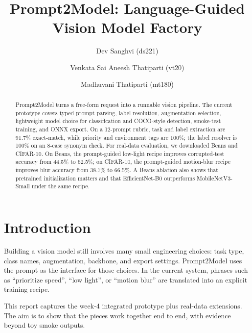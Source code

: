 \documentclass[10pt,twocolumn,letterpaper]{article}
\begin{document}
\title{Prompt2Model: Language-Guided Vision Model Factory}

\author{
Dev Sanghvi (ds221)
\and
Venkata Sai Aneesh Thatiparti (vt20)
\and
Madhuvani Thatiparti (mt180)
}

\maketitle

\begin{abstract}
Prompt2Model turns a free-form request into a runnable vision pipeline. The current prototype covers typed prompt parsing, label resolution, augmentation selection, lightweight model choice for classification and COCO-style detection, smoke-test training, and ONNX export. On a 12-prompt rubric, task and label extraction are 91.7\% exact-match, while priority and environment tags are 100\%; the label resolver is 100\% on an 8-case synonym check. For real-data evaluation, we downloaded Beans and CIFAR-10. On Beans, the prompt-guided low-light recipe improves corrupted-test accuracy from 44.5\% to 62.5\%; on CIFAR-10, the prompt-guided motion-blur recipe improves blur accuracy from 38.7\% to 66.5\%. A Beans ablation also shows that pretrained initialization matters and that EfficientNet-B0 outperforms MobileNetV3-Small under the same recipe.
\end{abstract}
\suppressfloats[t]

\section{Introduction}
Building a vision model still involves many small engineering choices: task type, class names, augmentation, backbone, and export settings. Prompt2Model uses the prompt as the interface for those choices. In the current system, phrases such as ``prioritize speed'', ``low light'', or ``motion blur'' are translated into an explicit training recipe.

This report captures the week-4 integrated prototype plus real-data extensions. The aim is to show that the pieces work together end to end, with evidence beyond toy smoke outputs.
\end{document}
